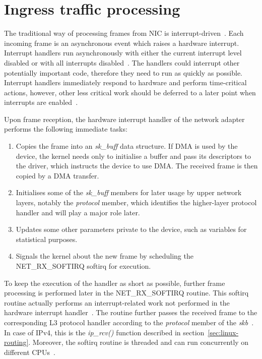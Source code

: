 
\section{Ingress traffic processing}\label{sec:linux-ingress}
The traditional way of processing frames from NIC is interrupt-driven~\cite{linux-kernel-networking}.
Each incoming frame is an asynchronous event which raises a hardware interrupt.
Interrupt handlers run asynchronously with either the current interrupt level disabled or with all
interrupts disabled~\cite{lkd2}.
The handlers could interrupt other potentially important code, therefore they need to run as quickly as possible.
Interrupt handlers immediately respond to hardware and perform time-critical actions,
however, other less critical work should be deferred to a later point when interrupts are enabled~\cite{lkd2}.

Upon frame reception, the hardware interrupt handler of the network adapter
performs the following immediate tasks:~\cite{understanding-internals}
\begin{enumerate}
\item Copies the frame into an {\it{sk\_buff}} data structure.
If DMA is used by the device, the kernel needs only to initialise a buffer and pass its descriptors to the driver,
which instructs the device to use DMA.
The received frame is then copied by a DMA transfer.
\item Initialises some of the {\it{sk\_buff}} members for later usage by upper network layers,
notably the {\it{protocol}} member, which identifies the higher-layer protocol handler and will play a major role later.
\item Updates some other parameters private to the device, such as variables for statistical purposes.
\item Signals the kernel about the new frame by scheduling the NET\_RX\_SOFTIRQ softirq for execution.
\end{enumerate}

To keep the execution of the handler as short as possible,
further frame processing is performed later in the NET\_RX\_SOFTIRQ routine.
This softirq routine actually performs an interrupt-related work
not performed in the hardware interrupt handler~\cite{understanding-internals}.
The routine further passes the received frame
to the corresponding L3 protocol handler according to the {\it{protocol}} member of the {\it{skb}}~\cite{lkd2}.
In case of IPv4, this is the {\it{ip\_rcv()}} function described in section~\ref{sec:linux-routing}.
Moreover, the softirq routine is threaded and can run concurrently on different CPUs~\cite{lkd2}.

